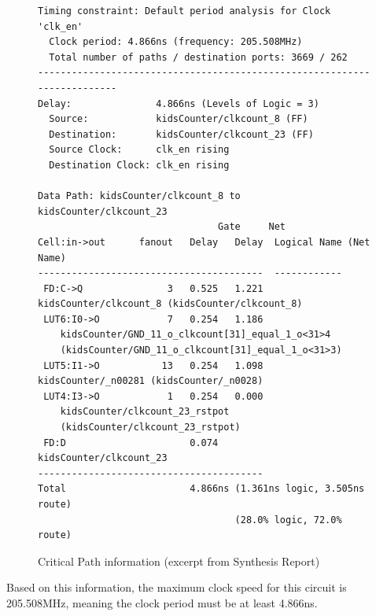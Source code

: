\documentclass{article}
\begin{document}
    \begin{figure}[H]
    	\caption{Critical Path information (excerpt from Synthesis Report)}
    	\begin{lstlisting}
Timing constraint: Default period analysis for Clock 'clk_en'
  Clock period: 4.866ns (frequency: 205.508MHz)
  Total number of paths / destination ports: 3669 / 262
-------------------------------------------------------------------------
Delay:               4.866ns (Levels of Logic = 3)
  Source:            kidsCounter/clkcount_8 (FF)
  Destination:       kidsCounter/clkcount_23 (FF)
  Source Clock:      clk_en rising
  Destination Clock: clk_en rising

Data Path: kidsCounter/clkcount_8 to kidsCounter/clkcount_23
                                Gate     Net
Cell:in->out      fanout   Delay   Delay  Logical Name (Net Name)
----------------------------------------  ------------
 FD:C->Q               3   0.525   1.221  kidsCounter/clkcount_8 (kidsCounter/clkcount_8)
 LUT6:I0->O            7   0.254   1.186  
    kidsCounter/GND_11_o_clkcount[31]_equal_1_o<31>4 
    (kidsCounter/GND_11_o_clkcount[31]_equal_1_o<31>3)
 LUT5:I1->O           13   0.254   1.098  kidsCounter/_n00281 (kidsCounter/_n0028)
 LUT4:I3->O            1   0.254   0.000  
    kidsCounter/clkcount_23_rstpot 
    (kidsCounter/clkcount_23_rstpot)
 FD:D                      0.074          kidsCounter/clkcount_23
----------------------------------------
Total                      4.866ns (1.361ns logic, 3.505ns route)
                                   (28.0% logic, 72.0% route)
    	\end{lstlisting}
    \end{figure}

    Based on this information, the maximum clock speed for this circuit is 205.508MHz, meaning the clock period must be at least 4.866ns.
	
\end{document}

